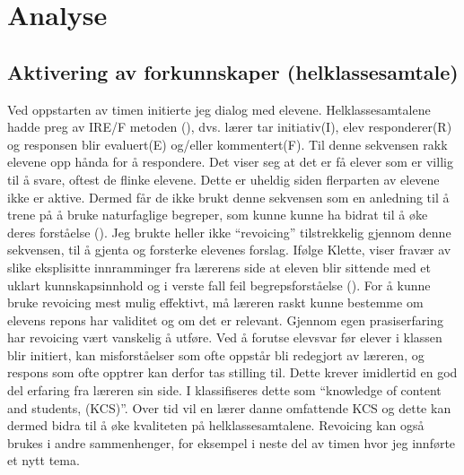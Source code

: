 \documentclass[main.tex]{subfiles}
\begin{document}
\section*{Analyse}
\label{sec:2}

\subsection*{Aktivering av forkunnskaper (helklassesamtale)}
Ved oppstarten av timen initierte jeg dialog med elevene. Helklassesamtalene hadde preg av
IRE/F metoden (), dvs. lærer tar initiativ(I), elev responderer(R) og responsen blir 
evaluert(E) og/eller kommentert(F). Til denne sekvensen rakk elevene opp hånda for å respondere. 
Det viser seg at det er få elever som er villig til å svare, oftest de flinke elevene. Dette 
er uheldig siden flerparten av elevene ikke er aktive. Dermed får de ikke brukt denne sekvensen som
en anledning til å trene på å bruke naturfaglige begreper, som kunne kunne ha bidrat til å øke deres 
forståelse ().
\newline
\newline
Jeg brukte heller ikke ``revoicing'' tilstrekkelig gjennom denne sekvensen, til å gjenta og 
forsterke elevenes forslag. Ifølge Klette, viser fravær av slike eksplisitte 
innramminger fra lærerens side at eleven blir sittende med et uklart kunnskapsinnhold og i 
verste fall feil begrepsforståelse (). For å kunne bruke revoicing 
mest mulig effektivt, må læreren raskt kunne bestemme om elevens repons har validitet 
og om det er relevant. Gjennom egen prasiserfaring har revoicing vært vanskelig å utføre.
Ved å forutse elevsvar før elever i klassen blir initiert, kan misforståelser som ofte oppstår bli 
redegjort av læreren, og respons som ofte opptrer kan derfor tas stilling til. Dette krever imidlertid 
en god del erfaring fra læreren sin side. I  klassifiseres dette som 
``knowledge of content and students, (KCS)''. Over tid vil en lærer danne omfattende KCS og
dette kan dermed bidra til å øke kvaliteten på helklassesamtalene. Revoicing kan også brukes
i andre sammenhenger, for eksempel i neste del av timen hvor jeg innførte et nytt tema. 
\end{document}
